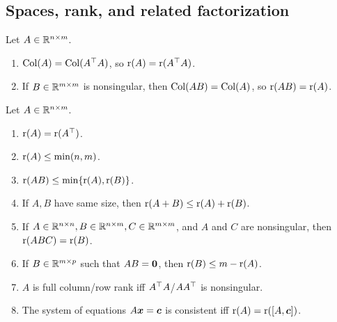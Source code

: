 \documentclass[10pt,a4paper]{book}
\begin{document}
\subsection{Spaces, rank, and related factorization}\label{sec:mat_space_rank_fact}
\begin{thmbox}
	\begin{theorem}\label{thm:mat_colsp}
		Let $A\in\mathbb R^{n\times m}$. 
	\begin{enumerate}
		\item $\mathrm{Col}(A)=\mathrm{Col}(A^\top A)$, so $\mathrm{r}(A)=\mathrm{r}(A^\top A)$.
		\item If $B\in\mathbb R^{m\times m}$ is nonsingular, then $\mathrm{Col}(AB)=\mathrm{Col}(A)$, so $\mathrm{r}(AB)=\mathrm{r}(A)$.
	\end{enumerate}
	\end{theorem}
\end{thmbox}


\begin{thmbox}
	\begin{theorem}\label{thm:mat_rank}
		Let $A\in\mathbb R^{n\times m}$. 
		\begin{enumerate}
			\item $\mathrm{r}(A)=\mathrm{r}(A^\top)$.
			\item $\mathrm{r}(A)\leq\min(n,m)$.   
			\item $\mathrm{r}(AB)\leq \min\{\mathrm{r}(A),\mathrm{r}(B)\}$.
			\item If $A,B$ have same size, then $\mathrm{r}(A+B)\leq\mathrm{r}(A)+\mathrm{r}(B)$.
			\item If $A\in\mathbb R^{n\times n},B\in\mathbb R^{n\times m},C\in\mathbb R^{m\times m}$, and $A$ and $C$ are nonsingular, then $\mathrm{r}(ABC)=\mathrm{r}(B)$. 
			\item If $B\in\mathbb R^{m\times p}$ such that $AB={\boldsymbol 0}$, then $\mathrm{r}(B)\leq m-\mathrm{r}(A)$.    
			\item $A$ is full column/row rank iff $A^\top A$/$AA^\top$ is nonsingular.  
			\item The system of equations $A{\boldsymbol x}={\boldsymbol c}$ is consistent iff $\mathrm{r}(A)=\mathrm{r}([A,{\boldsymbol c}])$.  
		\end{enumerate}
	\end{theorem}
\end{thmbox}
\end{document}
